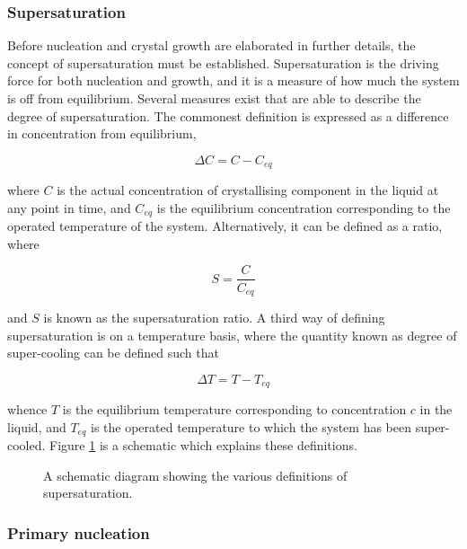\subsubsection{Supersaturation}

Before nucleation and crystal growth are elaborated in further details, the concept of supersaturation must be established. Supersaturation is the driving force for both nucleation and growth, and it is a measure of how much the system is off from equilibrium. Several measures exist that are able to describe the degree of supersaturation. The commonest definition is expressed as a difference in concentration from equilibrium,

\begin{equation}
    \Delta C = C - C_{eq}
\end{equation}

\noindent where $C$ is the actual concentration of crystallising component in the liquid at any point in time, and $C_{eq}$ is the equilibrium concentration corresponding to the operated temperature of the system. Alternatively, it can be defined as a ratio, where

\begin{equation} \label{eq: supersaturation ratio}
    S = \frac{C}{C_{eq}}
\end{equation}

\noindent and $S$ is known as the supersaturation ratio. A third way of defining supersaturation is on a temperature basis, where the quantity known as degree of super-cooling can be defined such that

\begin{equation}
     \Delta T = T - T_{eq}
\end{equation}

\noindent whence $T$ is the equilibrium temperature corresponding to concentration $c$ in the liquid, and $T_{eq}$ is the operated temperature to which the system has been super-cooled. Figure \ref{fig:supersaturation} is a schematic which explains these definitions.

\begin{figure}[h]
\centering

\caption{A schematic diagram showing the various definitions of supersaturation.}
\label{fig:supersaturation}
\end{figure}

\subsubsection{Primary nucleation}

